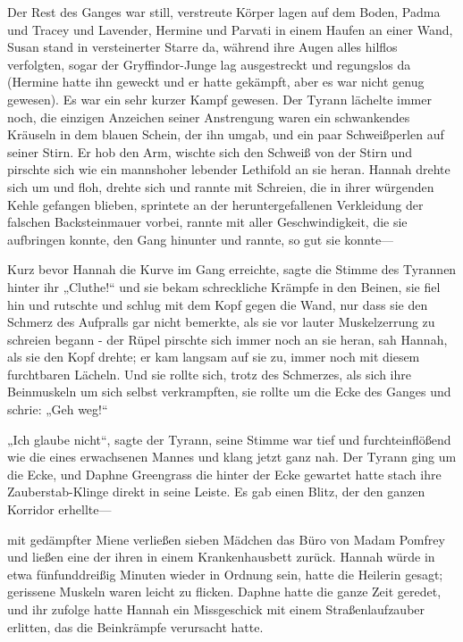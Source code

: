 {Der Rest des Ganges war still, verstreute Körper lagen auf dem Boden, Padma und Tracey und Lavender, Hermine und Parvati in einem Haufen an einer Wand, Susan stand in versteinerter Starre da, während ihre Augen alles hilflos verfolgten, sogar der Gryffindor-Junge lag ausgestreckt und regungslos da (Hermine hatte ihn geweckt und er hatte gekämpft, aber es war nicht genug gewesen). Es war ein sehr kurzer Kampf gewesen. Der Tyrann lächelte immer noch, die einzigen Anzeichen seiner Anstrengung waren ein schwankendes Kräuseln in dem blauen Schein, der ihn umgab, und ein paar Schweißperlen auf seiner Stirn. Er hob den Arm, wischte sich den Schweiß von der Stirn und pirschte sich wie ein mannshoher lebender Lethifold an sie heran. Hannah drehte sich um und floh, drehte sich und rannte mit Schreien, die in ihrer würgenden Kehle gefangen blieben, sprintete an der heruntergefallenen Verkleidung der falschen Backsteinmauer vorbei, rannte mit aller Geschwindigkeit, die sie aufbringen konnte, den Gang hinunter und rannte, so gut sie konnte—

Kurz bevor Hannah die Kurve im Gang erreichte, sagte die Stimme des Tyrannen hinter ihr „Cluthe!“ und sie bekam schreckliche Krämpfe in den Beinen, sie fiel hin und rutschte und schlug mit dem Kopf gegen die Wand, nur dass sie den Schmerz des Aufpralls gar nicht bemerkte, als sie vor lauter Muskelzerrung zu schreien begann - der Rüpel pirschte sich immer noch an sie heran, sah Hannah, als sie den Kopf drehte; er kam langsam auf sie zu, immer noch mit diesem furchtbaren Lächeln. Und sie rollte sich, trotz des Schmerzes, als sich ihre Beinmuskeln um sich selbst verkrampften, sie rollte um die Ecke des Ganges und schrie: „Geh weg!“

„Ich glaube nicht“, sagte der Tyrann, seine Stimme war tief und furchteinflößend wie die eines erwachsenen Mannes und klang jetzt ganz nah. Der Tyrann ging um die Ecke, und Daphne Greengrass die hinter der Ecke gewartet hatte stach ihre Zauberstab-Klinge direkt in seine Leiste. Es gab einen Blitz, der den ganzen Korridor erhellte—

mit gedämpfter Miene verließen sieben Mädchen das Büro von Madam Pomfrey und ließen eine der ihren in einem Krankenhausbett zurück. Hannah würde in etwa fünfunddreißig Minuten wieder in Ordnung sein, hatte die Heilerin gesagt; gerissene Muskeln waren leicht zu flicken. Daphne hatte die ganze Zeit geredet, und ihr zufolge hatte Hannah ein Missgeschick mit einem Straßenlaufzauber erlitten, das die Beinkrämpfe verursacht hatte.

}
